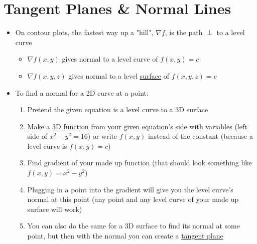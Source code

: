 \documentclass{article}
\begin{document}
\section{Tangent Planes \& Normal Lines}
\begin{itemize}
  \item On contour plots, the fastest way up a "hill", $\nabla f$, is the path $\perp$ to a level curve
  \begin{itemize}
    \item $\nabla f(x,y)$ gives normal to a level curve of $f(x,y) = c$
    \item $\nabla f(x,y,z)$ gives normal to a level \underline{surface} of $f(x,y,z) = c$
  \end{itemize}
  \item To find a normal for a 2D curve at a point:
  \begin{enumerate}
    \item Pretend the given equation is a level curve to a 3D surface
    \item Make a \underline{3D function} from your given equation's side with variables (left side of $x^2 - y^2 = 16$) or write $f(x,y)$ instead of the constant (because a level curve is $f(x,y) = c$)
    \item Find gradient of your made up function (that should look something like $f(x,y) = x^2 - y^2$)
    \item Plugging in a point into the gradient will give you the level curve's normal at this point (any point and any level curve of your made up surface will work)
    \item You can also do the same for a 3D surface to find its normal at some point, but then with the normal you can create a \underline{tangent plane}
  \end{enumerate}
\end{itemize}
\end{document}
